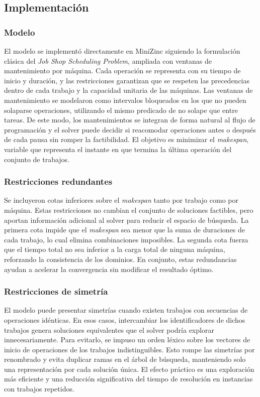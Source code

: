 
\subsection{Implementación}\label{sec:01-jobshop_mantenimiento-implementacion}

\subsubsection*{Modelo}
El modelo se implementó directamente en MiniZinc siguiendo la formulación clásica del \emph{Job Shop Scheduling Problem}, ampliada con ventanas de mantenimiento por máquina. Cada operación se representa con su tiempo de inicio y duración, y las restricciones garantizan que se respeten las precedencias dentro de cada trabajo y la capacidad unitaria de las máquinas.  
Las ventanas de mantenimiento se modelaron como intervalos bloqueados en los que no pueden solaparse operaciones, utilizando el mismo predicado de no solape que entre tareas. De este modo, los mantenimientos se integran de forma natural al flujo de programación y el solver puede decidir si reacomodar operaciones antes o después de cada pausa sin romper la factibilidad.  
El objetivo es minimizar el \emph{makespan}, variable que representa el instante en que termina la última operación del conjunto de trabajos.

\subsubsection*{Restricciones redundantes}
Se incluyeron cotas inferiores sobre el \emph{makespan} tanto por trabajo como por máquina. Estas restricciones no cambian el conjunto de soluciones factibles, pero aportan información adicional al solver para reducir el espacio de búsqueda.  
La primera cota impide que el \emph{makespan} sea menor que la suma de duraciones de cada trabajo, lo cual elimina combinaciones imposibles. La segunda cota fuerza que el tiempo total no sea inferior a la carga total de ninguna máquina, reforzando la consistencia de los dominios. En conjunto, estas redundancias ayudan a acelerar la convergencia sin modificar el resultado óptimo.

\subsubsection*{Restricciones de simetría}
El modelo puede presentar simetrías cuando existen trabajos con secuencias de operaciones idénticas. En esos casos, intercambiar los identificadores de dichos trabajos genera soluciones equivalentes que el solver podría explorar innecesariamente.  
Para evitarlo, se impuso un orden léxico sobre los vectores de inicio de operaciones de los trabajos indistinguibles. Esto rompe las simetrías por renombrado y evita duplicar ramas en el árbol de búsqueda, manteniendo solo una representación por cada solución única. El efecto práctico es una exploración más eficiente y una reducción significativa del tiempo de resolución en instancias con trabajos repetidos.